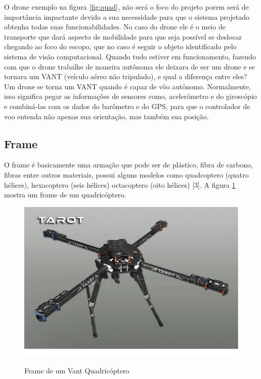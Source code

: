 O drone exemplo na figura \ref{fig:quad}, não será o foco do projeto porem será de importância impactante devido a sua necessidade para que o sistema projetado obtenha todas suas funcionabilidades. No caso do drone ele é o meio de transporte que dará aspecto de mobilidade para que seja possível se deslocar chegando ao foco do escopo, que no caso é seguir o objeto identificado pelo sistema de visão computacional.
Quando tudo estiver em funcionamento, fazendo com que o drone trabalhe de maneira autônoma ele deixara de ser um drone e se tornara um VANT (veículo aéreo não tripulado), e qual a diferença entre eles? Um drone se torna um VANT quando é capaz de vôo autônomo. Normalmente, isso significa pegar as informações de sensores como, acelerômetro e do giroscópio e combiná-las com os dados do barômetro e do GPS, para que o controlador de voo entenda não apenas sua orientação, mas também sua posição.

\subsection{Frame}
O frame é basicamente uma armação que pode ser de plástico, fibra de carbono, fibras entre outros materiais, possui alguns modelos como quadcoptero (quatro hélices), hexacoptero (seis hélices) octacoptero (oito hélices) [3]. A figura \ref{fig:frame} mostra um frame de um quadricóptero.

\begin{figure}[H]
  \centering
  \caption{Frame de um Vant Quadricóptero}
  \includegraphics[scale=.5]{figs/frame.jpg}
  \label{fig:frame}
\end{figure}
